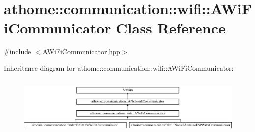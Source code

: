 \hypertarget{classathome_1_1communication_1_1wifi_1_1_a_wi_fi_communicator}{}\section{athome\+:\+:communication\+:\+:wifi\+:\+:A\+Wi\+Fi\+Communicator Class Reference}
\label{classathome_1_1communication_1_1wifi_1_1_a_wi_fi_communicator}


{\ttfamily \#include $<$A\+Wi\+Fi\+Communicator.\+hpp$>$}

Inheritance diagram for athome\+:\+:communication\+:\+:wifi\+:\+:A\+Wi\+Fi\+Communicator\+:\begin{figure}[H]
\begin{center}
\leavevmode
\includegraphics[height=2.871795cm]{classathome_1_1communication_1_1wifi_1_1_a_wi_fi_communicator}
\end{center}
\end{figure}
